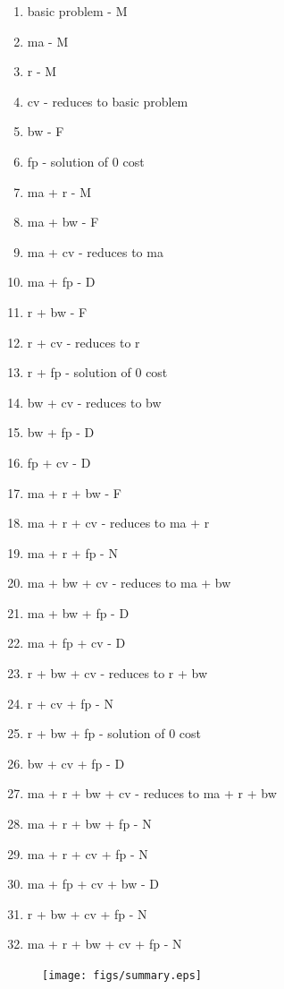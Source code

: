 \begin{enumerate}
\item basic problem - M
\item ma - M
\item r - M
\item cv - reduces to basic problem
\item bw - F
\item fp - solution of 0 cost
\item ma + r - M
\item  ma + bw - F
\item ma + cv - reduces to ma
\item ma + fp - D
\item r + bw - F
\item r + cv - reduces to r
\item r + fp - solution of 0 cost
\item bw + cv - reduces to bw
\item bw + fp - D
\item fp + cv - D
\item ma + r + bw - F
\item ma + r + cv - reduces to ma + r
\item ma + r + fp - N
\item ma + bw + cv - reduces to ma + bw
\item ma + bw + fp - D
\item ma + fp + cv - D
\item r + bw + cv - reduces to r + bw
\item r + cv + fp - N
\item r + bw + fp - solution of 0 cost
\item bw + cv + fp - D
\item ma + r + bw + cv - reduces to ma + r + bw
\item ma + r + bw + fp - N
\item ma + r + cv + fp - N
\item ma + fp + cv + bw - D
\item r + bw + cv + fp - N
\item ma + r + bw + cv + fp - N
\end{enumerate}


\begin{figure}[htbp]
\texttt{[image: figs/summary.eps]}
\end{figure}


